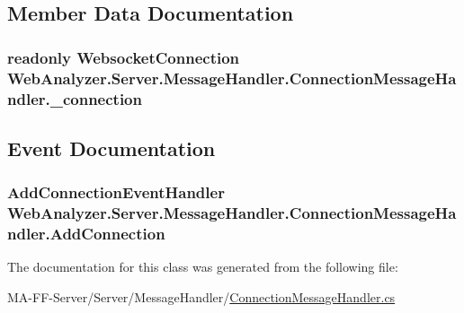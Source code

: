 \subsection{Member Data Documentation}
\hypertarget{class_web_analyzer_1_1_server_1_1_message_handler_1_1_connection_message_handler_ac9450ddba733401319fb68606dcfd3a3}{}
\subsubsection[{\+\_\+connection}]{\setlength{\rightskip}{0pt plus 5cm}readonly {\bf Websocket\+Connection} Web\+Analyzer.\+Server.\+Message\+Handler.\+Connection\+Message\+Handler.\+\_\+connection\hspace{0.3cm}{\ttfamily [private]}}\label{class_web_analyzer_1_1_server_1_1_message_handler_1_1_connection_message_handler_ac9450ddba733401319fb68606dcfd3a3}


\subsection{Event Documentation}
\hypertarget{class_web_analyzer_1_1_server_1_1_message_handler_1_1_connection_message_handler_a10b402c23b0015efb4b3643a064e7f09}{}
\subsubsection[{Add\+Connection}]{\setlength{\rightskip}{0pt plus 5cm}Add\+Connection\+Event\+Handler Web\+Analyzer.\+Server.\+Message\+Handler.\+Connection\+Message\+Handler.\+Add\+Connection}\label{class_web_analyzer_1_1_server_1_1_message_handler_1_1_connection_message_handler_a10b402c23b0015efb4b3643a064e7f09}


The documentation for this class was generated from the following file\+:\begin{DoxyCompactItemize}
\item 
M\+A-\/\+F\+F-\/\+Server/\+Server/\+Message\+Handler/\hyperlink{_connection_message_handler_8cs}{Connection\+Message\+Handler.\+cs}\end{DoxyCompactItemize}
